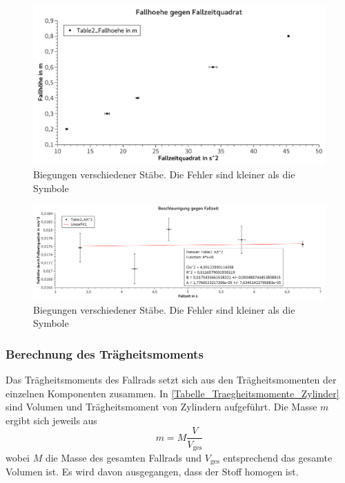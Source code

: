 \documentclass[
	a4paper,
	12pt,
	pagesize,
	ngerman
]{scrartcl}
\begin{document}
	\begin{figure}[tb]
		\includegraphics[width=1\textwidth]{HoeheGegenZeitquadrat}
		\centering
		\caption{Biegungen verschiedener Stäbe. Die Fehler sind kleiner als die Symbole}
		\label{HoeheGegenZeitquadrat}
		\centering
	\end{figure}
	\begin{figure}[tb]
		\includegraphics[width=1\textwidth]{BeschleunigungGegenZeit} %
		\centering
		\caption{Biegungen verschiedener Stäbe. Die Fehler sind kleiner als die Symbole}
		\label{BeschleunigungGegenZeit}
		\centering
	\end{figure}



	\subsubsection*{Berechnung des Trägheitsmoments}
	Das Trägheitsmoments des Fallrads setzt sich aus den Trägheitsmomenten der einzelnen Komponenten zusammen.  %
	In \cref{Tabelle_Traegheitsmomente_Zylinder} sind Volumen und Trägheitsmoment von Zylindern aufgeführt. 
	Die Masse $m$ ergibt sich jeweils aus 
	\begin{equation}
		m = M \frac{V}{V_\text{ges}} 
	\end{equation}
	wobei $M$ die Masse des gesamten Fallrads und $V_\text{ges}$ entsprechend das gesamte Volumen ist. Es wird davon ausgegangen, dass der Stoff homogen ist. %
\end{document}
